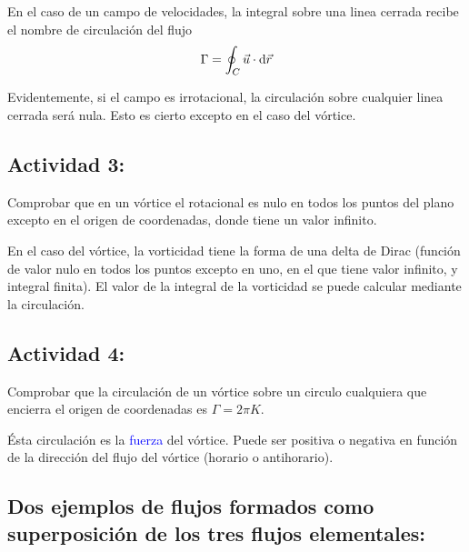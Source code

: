 	En el caso de un campo de velocidades, la integral sobre una linea
	cerrada recibe el nombre de circulación del flujo 
	\[
	\Gamma=\oint_{C}\vec{u}\cdot\text{d}\vec{r}
	\]
	
	Evidentemente, si el campo es irrotacional, la circulación sobre cualquier
	linea cerrada será nula. Esto es cierto excepto en el caso del vórtice.

	
	\subsection*{Actividad 3:}
		Comprobar que en un vórtice el rotacional es nulo en todos los puntos
		del plano excepto en el origen de coordenadas, donde tiene un valor
		infinito.
		
		En el caso del vórtice, la vorticidad tiene la forma de una delta
		de Dirac (función de valor nulo en todos los puntos excepto en uno,
		en el que tiene valor infinito, y integral finita). El valor de la
		integral de la vorticidad se puede calcular mediante la circulación.

	\subsection*{Actividad 4:}
		Comprobar que la circulación de un vórtice sobre un circulo cualquiera
		que encierra el origen de coordenadas es $\Gamma=2\pi K$.

Ésta circulación es la \textcolor{blue}{fuerza}
		del vórtice. Puede ser positiva o negativa en función de la dirección
		del flujo del vórtice (horario o antihorario).

\subsection{Dos ejemplos de flujos formados como superposición de los tres flujos
		elementales:}
	
